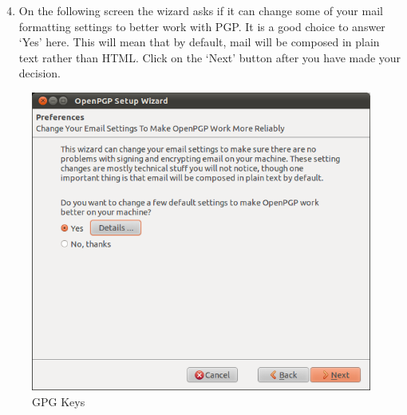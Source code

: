 \begin{enumerate}[1.]
\setcounter{enumi}{3}
\item
  On the following screen the wizard asks if it can change some of your
  mail formatting settings to better work with PGP. It is a good choice
  to answer `Yes' here. This will mean that by default, mail will be
  composed in plain text rather than HTML. Click on the `Next' button
  after you have made your decision.
\end{enumerate}
\begin{figure}[htbp]
\centering
\includegraphics{gpg_keys_4.png}
\caption{GPG Keys}
\end{figure}

